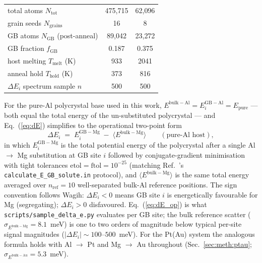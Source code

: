 \begin{table}[t]
\begin{tabular}{lcc}
total atoms $N_\mathrm{tot}$              & 475{,}715                         & 62{,}096                        \\
grain seeds $N_\mathrm{grains}$           & 16                                & 8                               \\
GB atoms $N_\mathrm{GB}$ (post-anneal)    & 89{,}042                          & 23{,}272                        \\
GB fraction $f_\mathrm{GB}$               & 0.187                             & 0.375                           \\
host melting $T_\mathrm{melt}$ (K)        & 933                               & 2041                            \\
anneal hold $T_\mathrm{hold}$ (K)         & 373                               & 816                             \\
$\Delta E_i$ spectrum sample $n$          & 500                               & 500                             \\
\bottomrule
\end{tabular}
\end{table}



For the pure-Al polycrystal base used in this work,
$E^{\mathrm{bulk-Al}} = E_i^{\mathrm{GB-Al}} = E_\mathrm{pure}$ — both
equal the total energy of the un-substituted polycrystal — and
Eq.~(\ref{eq:dE}) simplifies to the operational two-point form
\begin{equation}\label{eq:dE_op}
\Delta E_i \;=\; E_i^{\mathrm{GB-Mg}}
            \;-\; \big\langle E^{\mathrm{bulk-Mg}} \big\rangle
\qquad (\text{pure-Al host}),
\end{equation}
in which $E_i^{\mathrm{GB-Mg}}$ is the total potential energy of the
polycrystal after a single Al $\to$ Mg substitution at GB site $i$
followed by conjugate-gradient minimisation with tight tolerances
$\mathrm{etol} = \mathrm{ftol} = 10^{-25}$ (matching
Ref.~\cite{Wagih2020}'s \texttt{calculate\_E\_GB\_solute.in} protocol),
and $\langle E^{\mathrm{bulk-Mg}} \rangle$ is the same total energy
averaged over $n_\mathrm{ref} = 10$ well-separated bulk-Al reference
positions. The sign convention follows Wagih: $\Delta E_i < 0$ means
GB site $i$ is energetically favourable for Mg (segregating); $\Delta
E_i > 0$ disfavoured. Eq.~(\ref{eq:dE_op}) is what
\texttt{scripts/sample\_delta\_e.py} evaluates per GB site; the bulk
reference scatter ($\sigma_{E^{\mathrm{bulk-Mg}}} = 8.1$~meV) is one
to two orders of magnitude below typical per-site signal magnitudes
($|\Delta E_i| \sim 100$--$500$~meV). For the Pt(Au) system the
analogous formula holds with Al $\to$ Pt and Mg $\to$ Au throughout
(Sec.~\ref{sec:meth:ptau}; $\sigma_{E^{\mathrm{bulk-Au}}}
= 5.3$~meV).


